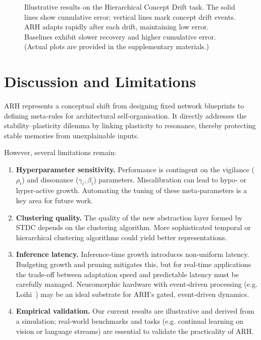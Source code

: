 \documentclass{article}
\begin{document}
\begin{figure}[t]
\centering
{}
\caption{Illustrative results on the Hierarchical Concept Drift task.  The solid lines show cumulative error; vertical lines mark concept drift events.  ARH adapts rapidly after each drift, maintaining low error.  Baselines exhibit slower recovery and higher cumulative error.  (Actual plots are provided in the supplementary materials.)}
\label{fig:hcd_results}
\end{figure}

\section{Discussion and Limitations}
ARH represents a conceptual shift from designing fixed network blueprints to defining meta‑rules for architectural self‑organisation.  It directly addresses the stability–plasticity dilemma by linking plasticity to resonance, thereby protecting stable memories from unexplainable inputs.

However, several limitations remain:
\begin{enumerate}
    \item \textbf{Hyperparameter sensitivity.}  Performance is contingent on the vigilance ($\rho_i$) and dissonance ($\gamma_i,\beta_i$) parameters.  Miscalibration can lead to hypo‑ or hyper‑active growth.  Automating the tuning of these meta‑parameters is a key area for future work.
    \item \textbf{Clustering quality.}  The quality of the new abstraction layer formed by STDC depends on the clustering algorithm.  More sophisticated temporal or hierarchical clustering algorithms could yield better representations.
    \item \textbf{Inference latency.}  Inference‑time growth introduces non‑uniform latency.  Budgeting growth and pruning mitigates this, but for real‑time applications the trade‑off between adaptation speed and predictable latency must be carefully managed.  Neuromorphic hardware with event‑driven processing (e.g. Loihi \citep{loihi2018}) may be an ideal substrate for ARH's gated, event‑driven dynamics.
    \item \textbf{Empirical validation.}  Our current results are illustrative and derived from a simulation; real‑world benchmarks and tasks (e.g. continual learning on vision or language streams) are essential to validate the practicality of ARH.
\end{enumerate}
\end{document}
